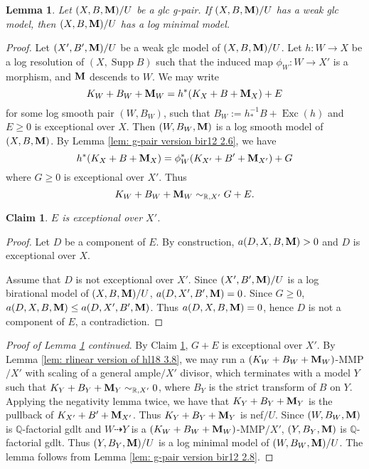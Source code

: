 \documentclass[11pt]{amsart}
\numberwithin{equation}{section}
\newcommand{\Mm}{{\bf{M}}}
\newcommand{\Qq}{\mathbb{Q}}
\newcommand{\Rr}{\mathbb{R}}
\newcommand{\Exc}{\operatorname{Exc}}
\newcommand{\Supp}{\operatorname{Supp}}
\newtheorem{lem}[thm]{Lemma}
\newtheorem{claim}[thm]{Claim}
\theoremstyle{definition}
\theoremstyle{definition}
\theoremstyle{definition}
\begin{document}
\begin{lem}\label{lem: g-pair weak glc imply lmm}
Let $(X,B,\Mm)/U$ be a glc g-pair. If $(X,B,\Mm)/U$ has a weak glc model, then $(X,B,\Mm)/U$ has a log minimal model.
\end{lem}
\begin{proof}
Let $(X',B',\Mm)/U$ be a weak glc model of $(X,B,\Mm)/U$. Let $h: W\rightarrow X$ be a log resolution of $(X,\Supp B)$ such that the induced map $\phi_W: W\rightarrow X'$ is a morphism, and $\Mm$ descends to $W$. We may write
$$K_W+B_W+\Mm_W=h^*(K_X+B+\Mm_X)+E$$
for some log smooth pair $(W,B_W)$, such that $B_W:=h^{-1}_*B+\Exc(h)$ and $E\geq 0$ is exceptional over $X$. Then $(W,B_W,\Mm)$ is a log smooth model of $(X,B,\Mm)$. By Lemma \ref{lem: g-pair version bir12 2.6}, we have
$$h^*(K_X+B+\Mm_X)=\phi_W^*(K_{X'}+B'+\Mm_{X'})+G$$
where $G\geq 0$ is exceptional over $X'$. Thus
$$K_W+B_W+\Mm_W\sim_{\mathbb R,X'}G+E.$$

\begin{claim}\label{claim: wglc to lmm E exceptional}
$E$ is exceptional over $X'$.
\end{claim}
\begin{proof}
Let $D$ be a component of $E$. By construction, $a(D,X,B,\Mm)>0$ and $D$ is exceptional over $X$. 

Assume that  $D$ is not exceptional over $X'$. Since $(X',B',\Mm)/U$ is a log birational model of $(X,B,\Mm)/U$, $a(D,X',B',\Mm)=0$. Since $G\geq 0$, $a(D,X,B,\Mm)\leq a(D,X',B',\Mm)$. Thus $a(D,X,B,\Mm)=0$, hence $D$ is not a component of $E$, a contradiction.
\end{proof}

\noindent\textit{Proof of Lemma \ref{lem: g-pair weak glc imply lmm} continued}. By Claim \ref{claim: wglc to lmm E exceptional}, $G+E$ is exceptional over $X'$. By Lemma \ref{lem: rlinear version of hl18 3.8}, we may run a $(K_W+B_W+\Mm_W)$-MMP$/X'$ with scaling of a general ample$/X'$ divisor, which terminates with a model $Y$ such that $K_Y+B_Y+\Mm_Y\sim_{\Rr,X'}0$, where $B_Y$ is the strict transform of $B$ on $Y$. Applying the negativity lemma twice, we have that $K_Y+B_Y+\Mm_Y$ is the pullback of $K_{X'}+B'+\Mm_{X'}$. Thus $K_Y+B_Y+\Mm_Y$ is nef$/U$. Since $(W,B_W,\Mm)$ is $\Qq$-factorial gdlt and $W\dashrightarrow Y$ is a $(K_W+B_W+\Mm_W)$-MMP$/X'$, $(Y,B_Y,\Mm)$ is $\Qq$-factorial gdlt. Thus $(Y,B_Y,\Mm)/U$ is a log minimal model of $(W,B_W,\Mm)/U$. The lemma follows from Lemma \ref{lem: g-pair version bir12 2.8}.
\end{proof}
\end{document}

